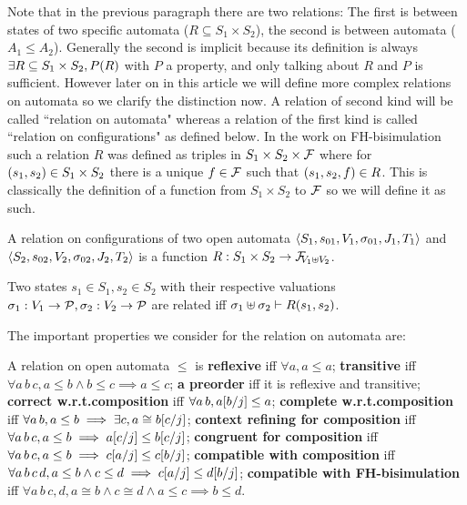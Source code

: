 \documentclass{article}
\begin{document}
Note that in the previous paragraph there are two relations:
The first is between states of two specific automata (\(R \subseteq S_1 \times S_2\)), the second is between automata (\(A_1 \leq A_2\)).
Generally the second is implicit because its definition is always \(\exists R \subseteq S_1 \times S_2, P\mpar{R}\) with \(P\) a property, and only talking about \(R\) and \(P\) is sufficient.
However later on in this article we will define more complex relations on automata so we clarify the distinction now.
A relation of second kind will be called ``relation on automata" whereas a relation of the first kind is called ``relation on configurations" as defined below.
In the work on FH-bisimulation such a relation \(R\) was defined as triples in \(S_1 \times S_2 \times \formulas\) where for \(\mpar{s_1, s_2} \in S_1 \times S_2\) there is a unique \(f \in \formulas\) such that \(\mpar{s_1, s_2, f} \in R\).
This is classically the definition of a function from \(S_1 \times S_2\) to \(\formulas\) so we will define it as such.
\begin{defi}
A relation on configurations of two open automata \(\OAg[1]\) and \(\OAg[2]\) is a function \(R: S_1 \times S_2 \to \rformulas[V_1 \uplus V_2]\).

Two states \(s_1 \in S_1, s_2 \in S_2\) with their respective valuations \(\sigma_1: V_1 \to \values, \sigma_2: V_2 \to \values\) are related iff \(\sigma_1 \uplus \sigma_2 \vdash R\mpar{s_1, s_2}\).
\end{defi}
The important properties we consider for the relation on automata are:
\begin{defi} A relation on open automata \(\leq\) is
 \textbf{reflexive} iff \(\forall a, a \leq a\);
 \textbf{transitive} iff \(\forall a\, b\, c, a \leq b \wedge b \leq c \implies a \leq c\);
 \textbf{a preorder} iff it is reflexive and transitive;
 \textbf{correct w.r.t.\@ composition} iff \(\forall a\, b, a\subst{b}{j} \leq a\);
 \textbf{complete w.r.t.\@ composition} iff \(\forall a\, b, a \leq b \implies \exists c, a \cong b\subst{c}{j}\);
 \textbf{context refining for composition} iff \(\forall a\, b\, c, a \leq b \implies a\subst{c}{j} \leq b\subst{c}{j}\);
 \textbf{congruent for composition} iff \(\forall a\, b\, c, a \leq b \implies c\subst{a}{j} \leq c\subst{b}{j}\);
 \textbf{compatible with composition} iff \(\forall a\, b\, c\, d, a \leq b \wedge c \leq d \implies c\subst{a}{j} \leq d\subst{b}{j}\);
 \textbf{compatible with FH-bisimulation} iff \(\forall a\, b\, c, d, a \cong b \wedge c \cong d \wedge a \leq c \implies b \leq d\).
\end{defi}
\end{document}
